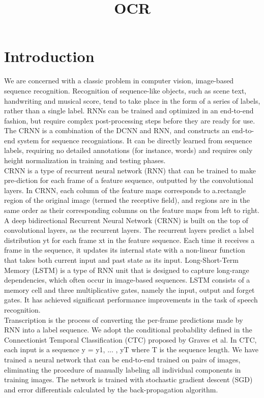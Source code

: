\documentclass{article}
\title{OCR}
\begin{document}
\maketitle

\section{Introduction}

We are concerned with a classic problem in computer vision, image-based sequence recognition. Recognition of sequence-like objects, such as scene text, handwriting and musical score, tend to take place in the form of a series of labels, rather than a single label. RNNs can be trained and optimized in an end-to-end fashion, but require complex post-processing steps before they are ready for use. The CRNN is a combination of the DCNN and RNN, and constructs an end-to-end system for sequence recogniations. It can be directly learned from sequence labels, requiring no detailed annotations (for instance, words) and requires only height normalization in training and testing phases.\\

CRNN is a type of recurrent neural network (RNN) that can be trained to make pre-diction for each frame of a feature sequence, outputted by the convolutional layers. In CRNN, each column of the feature maps corresponds to a.rectangle region of the original image (termed the receptive field), and regions are in the same order as their corresponding columns on the feature maps from left to right. A deep bidirectional Recurrent Neural Network (CRNN) is built on the top of convolutional layers, as the recurrent layers.
The recurrent layers predict a label distribution yt for each frame xt in the feature sequence. Each time it receives a frame in the sequence, it updates its internal state with a non-linear function that takes both current input and past state as its input. Long-Short-Term Memory (LSTM) is a type of RNN unit that is designed to capture long-range dependencies, which often occur in image-based sequences. LSTM consists of a memory cell and three multiplicative gates, namely the input, output and forget gates. It has achieved significant performance improvements in the task of speech recognition.\\

Transcription is the process of converting the per-frame predictions made by RNN into a label sequence. We adopt the conditional probability defined in the Connectionist Temporal Classification (CTC) proposed by Graves et al. In CTC, each input is a sequence y = y1, ... , yT where T is the sequence length.
We have trained a neural network that can be end-to-end trained on pairs of images, eliminating the procedure of manually labeling all individual components in training images. The network is trained with stochastic gradient descent (SGD) and error differentials calculated by the back-propagation algorithm.\\
\end{document}
